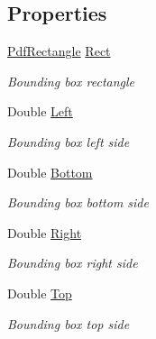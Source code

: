\subsection*{Properties}
\begin{DoxyCompactItemize}
\item 
\hyperlink{class_pdf_file_writer_1_1_pdf_rectangle}{Pdf\+Rectangle} \hyperlink{class_pdf_file_writer_1_1_pdf_x_object_a36a3e526715046c9383a346ddc79c115}{Rect}
\begin{DoxyCompactList}\small\item\em Bounding box rectangle \end{DoxyCompactList}\item 
Double \hyperlink{class_pdf_file_writer_1_1_pdf_x_object_abb625de702ab0b9173e8b6986c5fc897}{Left}
\begin{DoxyCompactList}\small\item\em Bounding box left side \end{DoxyCompactList}\item 
Double \hyperlink{class_pdf_file_writer_1_1_pdf_x_object_a1ad95b8f6e73069322ba17eaa1c15009}{Bottom}
\begin{DoxyCompactList}\small\item\em Bounding box bottom side \end{DoxyCompactList}\item 
Double \hyperlink{class_pdf_file_writer_1_1_pdf_x_object_ad310f9733f70f8437b1d8bd14672b46b}{Right}
\begin{DoxyCompactList}\small\item\em Bounding box right side \end{DoxyCompactList}\item 
Double \hyperlink{class_pdf_file_writer_1_1_pdf_x_object_aef335a0c44ebde448d00164b341d361c}{Top}
\begin{DoxyCompactList}\small\item\em Bounding box top side \end{DoxyCompactList}\end{DoxyCompactItemize}


